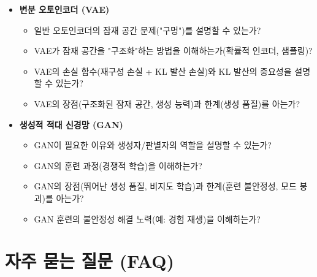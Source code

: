 \documentclass[11pt,a4paper]{article}
\begin{document}
\begin{tcolorbox}[summarybox, title=학습 점검 체크리스트]
\begin{itemize}
\begin{itemize}
        \item "방출 점수(Emission Scores)"의 의미와 역할은 무엇인가?
        \item Bi-LSTM-CRF의 장점(자동 특징 학습)과 단점(높은 계산 비용)을 아는가?
    \end{itemize}
    \item \textbf{변분 오토인코더 (VAE)}
    \begin{itemize}
        \item 일반 오토인코더의 잠재 공간 문제("구멍")를 설명할 수 있는가?
        \item VAE가 잠재 공간을 "구조화"하는 방법을 이해하는가(확률적 인코더, 샘플링)?
        \item VAE의 손실 함수(재구성 손실 + KL 발산 손실)와 KL 발산의 중요성을 설명할 수 있는가?
        \item VAE의 장점(구조화된 잠재 공간, 생성 능력)과 한계(생성 품질)를 아는가?
    \end{itemize}
    \item \textbf{생성적 적대 신경망 (GAN)}
    \begin{itemize}
        \item GAN이 필요한 이유와 생성자/판별자의 역할을 설명할 수 있는가?
        \item GAN의 훈련 과정(경쟁적 학습)을 이해하는가?
        \item GAN의 장점(뛰어난 생성 품질, 비지도 학습)과 한계(훈련 불안정성, 모드 붕괴)를 아는가?
        \item GAN 훈련의 불안정성 해결 노력(예: 경험 재생)을 이해하는가?
    \end{itemize}
\end{itemize}
\end{tcolorbox}

\newpage
\section*{자주 묻는 질문 (FAQ)}
\end{document}

